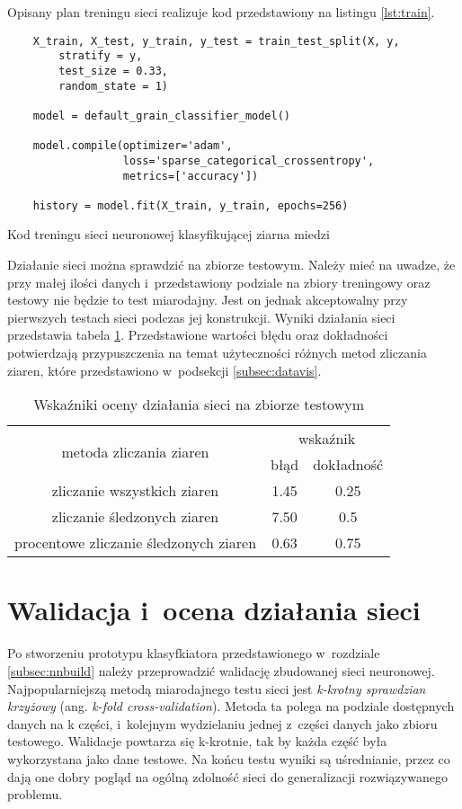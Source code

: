 Opisany plan treningu sieci realizuje kod przedstawiony na listingu
\ref{lst:train}.
\begin{listing}[htbp]
\begin{verbatim}
    X_train, X_test, y_train, y_test = train_test_split(X, y,
        stratify = y,
        test_size = 0.33,
        random_state = 1)

    model = default_grain_classifier_model()

    model.compile(optimizer='adam',
                  loss='sparse_categorical_crossentropy',
                  metrics=['accuracy'])
    
    history = model.fit(X_train, y_train, epochs=256)
\end{verbatim}
\caption{Kod treningu sieci neuronowej klasyfikującej ziarna miedzi}
\label{lst:train}
\end{listing}
Działanie sieci można sprawdzić na zbiorze testowym.
Należy mieć na uwadze, że przy małej ilości danych i~przedstawiony 
podziale na zbiory treningowy oraz testowy nie będzie to test miarodajny.
Jest on jednak akceptowalny przy pierwszych testach sieci podczas jej
konstrukcji.
Wyniki działania sieci przedstawia tabela \ref{tab:blobtest}.
Przedstawione wartości błędu oraz dokładności potwierdzają przypuszczenia
na temat użyteczności różnych metod zliczania ziaren, które przedstawiono
w~podsekcji \ref{subsec:datavis}.

\begin{table}[htbp]
	\centering
	\begin{tabular}{c|c|c}
	\toprule
	\multirow{2}{*}{metoda zliczania ziaren} & \multicolumn{2}{c}{wskaźnik} \\ 
                                         & błąd       & dokładność      \\ \midrule
zliczanie wszystkich ziaren              & 1.45       & 0.25            \\
zliczanie śledzonych ziaren              & 7.50       & 0.5             \\
procentowe zliczanie śledzonych ziaren   & 0.63       & 0.75           \\   
	\bottomrule
	\end{tabular}
\caption{Wskaźniki oceny działania sieci na zbiorze testowym}
\label{tab:blobtest}
\end{table}

\section{Walidacja i~ocena działania sieci} \label{sec:validation}
Po stworzeniu prototypu klasyfkiatora przedstawionego w~rozdziale
\ref{subsec:nnbuild} należy przeprowadzić walidację zbudowanej sieci
neuronowej.
Najpopularniejszą metodą miarodajnego testu sieci jest 
\emph{k-krotny sprawdzian krzyżowy} (ang. \textit{k-fold cross-validation}).
Metoda ta polega na podziale dostępnych danych na k części, i~kolejnym
wydzielaniu jednej z~części danych jako zbioru testowego.
Walidacje powtarza się k-krotnie, tak by każda część była wykorzystana
jako dane testowe.
Na końcu testu wyniki są uśrednianie, przez co dają one dobry pogląd na
ogólną zdolność sieci do generalizacji rozwiązywanego problemu.

